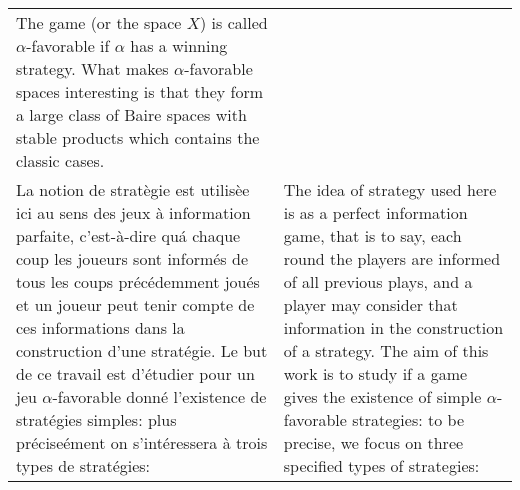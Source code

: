 \documentclass[12pt]{article}
\theoremstyle{plain}
\theoremstyle{definition}
\theoremstyle{remark}
\begin{document}
\begin{tabular}{p{2.8in} p{2.8in}}
The game (or the space $X$) is called $\alpha$-favorable if $\alpha$ has a winning strategy. What makes $\alpha$-favorable spaces interesting is that they form a large class of Baire spaces with stable products which contains the classic cases.

\\

La notion de strat\`egie est utilis\`ee ici au sens des jeux \`a information parfaite, c'est-\`a-dire qu\'a chaque coup les joueurs sont inform\'es de tous les coups pr\'ec\'edemment jou\'es et un joueur peut tenir compte de ces informations dans la construction d'une strat\'egie. Le but de ce travail est d'\'etudier pour un jeu $\alpha$-favorable donn\'e l'existence de strat\'egies simples: plus pr\'ecise\'ement on s'int\'eressera \`a trois types de strat\'egies:

&

The idea of strategy used here is as a perfect information game, that is to say, each round the players are informed of all previous plays, and a player may consider that information in the construction of a strategy. The aim of this work is to study if a game gives the existence of simple $\alpha$-favorable strategies: to be precise, we focus on three specified types of strategies:

\end{tabular}
\end{document}
